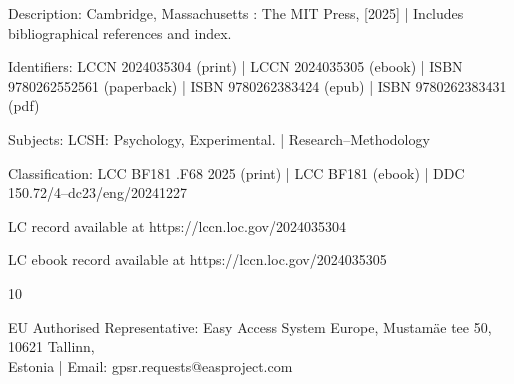 \begin{titlepage}
{\begin{tcolorbox}[size=minimal, boxrule=0pt, width=0.6\linewidth]
{    Description: Cambridge, Massachusetts : The MIT Press, [2025] | Includes
       bibliographical references and index.
    
    Identifiers: LCCN 2024035304 (print) | LCCN 2024035305 (ebook) | ISBN
       9780262552561 (paperback) | ISBN 9780262383424 (epub) | ISBN
       9780262383431 (pdf) 
    
    Subjects: LCSH: Psychology, Experimental. | Research--Methodology
    
    Classification: LCC BF181 .F68 2025  (print) | LCC BF181  (ebook) | DDC
       150.72/4--dc23/eng/20241227
    
    LC record available at https://lccn.loc.gov/2024035304
    
    LC ebook record available at https://lccn.loc.gov/2024035305\par
    }
  \end{tcolorbox}
  
    10\par
    \vspace{2ex}
    EU Authorised Representative: Easy Access System Europe, Mustamäe tee 50, 10621 Tallinn,\\
    Estonia | Email: gpsr.requests@easproject.com\par
  }
  \vspace*{\fill}
\end{titlepage}

\restoregeometry{}
